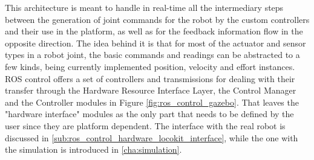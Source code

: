 This architecture is meant to handle in real-time all the intermediary steps between the generation of joint commands for the robot by the custom controllers and their use in the platform, as well as for the feedback information flow in the opposite direction.
The idea behind it is that for most of the actuator and sensor types in a robot joint, the basic commands and readings can be abstracted to a few kinds, being currently implemented position, velocity and effort instances.
ROS control offers a set of controllers and transmissions for dealing with their transfer through the Hardware Resource Interface Layer, the Control Manager and the Controller modules in Figure \ref{fig:ros_control_gazebo}.
That leaves the "hardware interface" modules as the only part that needs to be defined by the user since they are platform dependent.
The interface with the real robot is discussed in \ref{sub:ros_control_hardware_locokit_interface}, while the one with the simulation is introduced in \ref{cha:simulation}.


